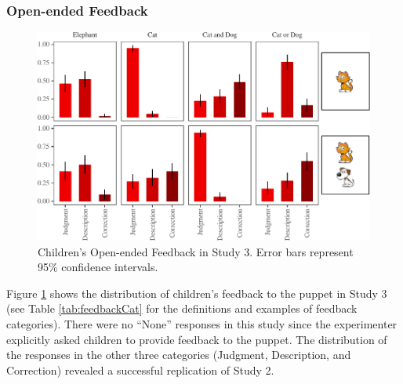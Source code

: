 \documentclass[floatsintext,man]{apa6}
\theoremstyle{definition}
\theoremstyle{definition}
\theoremstyle{definition}
\theoremstyle{remark}
\begin{document}
\subsubsection{Open-ended Feedback}\label{open-ended-feedback}

\begin{figure}
\centering
\includegraphics{figs/feedbackStudy3-1.pdf}
\caption{\label{fig:feedbackStudy3}Children's Open-ended Feedback in Study
3. Error bars represent 95\% confidence intervals.}
\end{figure}

Figure \ref{fig:feedbackStudy3} shows the distribution of children's
feedback to the puppet in Study 3 (see Table \ref{tab:feedbackCat} for
the definitions and examples of feedback categories). There were no
\enquote{None} responses in this study since the experimenter explicitly
asked children to provide feedback to the puppet. The distribution of
the responses in the other three categories (Judgment, Description, and
Correction) revealed a successful replication of Study 2.
\end{document}
